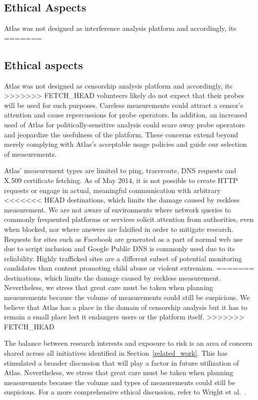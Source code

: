 \subsection{Ethical Aspects}

Atlas was not designed as interference analysis platform and accordingly, its
=======
\subsection{Ethical aspects}
Atlas was not designed as censorship analysis platform and accordingly, its
>>>>>>> FETCH_HEAD
volunteers likely do not expect that their probes will be used for such
purposes.  Careless measurements could attract a censor's attention and cause
repercussions for probe operators.  In addition, an increased used of Atlas for
politically-sensitive analysis could scare away probe operators and jeopardize the
usefulness of the platform. These concerns extend beyond merely complying with Atlas's
acceptable usage policies and guide our selection of measurements.

Atlas' measurement types are limited to ping, traceroute, DNS requests and
X.509 certificate fetching.  As of May 2014, it is not possible to create HTTP
requests or engage in actual, meaningful communication with arbitrary
<<<<<<< HEAD
destinations, which limits the damage caused by reckless measurement. We are not aware of environments where network queries to commonly frequented platforms or services solicit attention from authorities, even when blocked, nor where answers are falsified in order to mitigate research. Requests for sites such as Facebook are generated as a part of normal web use due to script inclusion and Google Public DNS is commonly used due to its reliability. Highly trafficked sites are a different subset of potential monitoring candidates than content promoting child abuse or violent extremism. 
=======
destinations, which limits the damage caused by reckless measurement.
Nevertheless, we stress that great care must be taken when planning
measurements because the volume of measurements could still be suspicious.  We
believe that Atlas has a place in the domain of censorship analysis but it
has to remain a small place lest it endangers users or the platform itself.
>>>>>>> FETCH_HEAD

The balance between research interests and exposure to risk is an area of concern shared across all initiatives identified in Section~\ref{related_work}. This has stimulated a broader discussion that will play a factor in future utilization of Atlas. Nevertheless, we stress that great care must be taken when planning measurements because the volume and types of measurements could still be suspicious. For a more comprehensive ethical discussion, refer to Wright et al.~\cite[\S~5]{Wright2011}.
